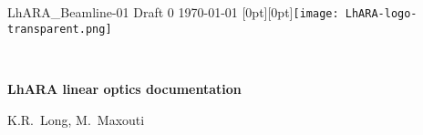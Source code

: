\graphicspath{ {00-Top-matter/Figures/} }
\thispagestyle{empty}

\noindent LhARA\_Beamline-01 Draft 0 \hfill \today{} \hfill  \raisebox{-3.25mm}[0pt][0pt]{\texttt{[image: LhARA-logo-transparent.png]}}

\vspace{-0.25cm}
\noindent{\color{DarkYellow} \rule[0mm]{\textwidth}{0.43pt}}\\
\vspace{-0.50cm}
\begin{center}
  {\bf\LARGE\color{DarkBlue}
    LhARA linear optics documentation
  }
\end{center}
\vspace{-0.4cm}
\begin{center}
  K.R.~Long, M.~Maxouti
\end{center}
\vspace{-0.2cm}
